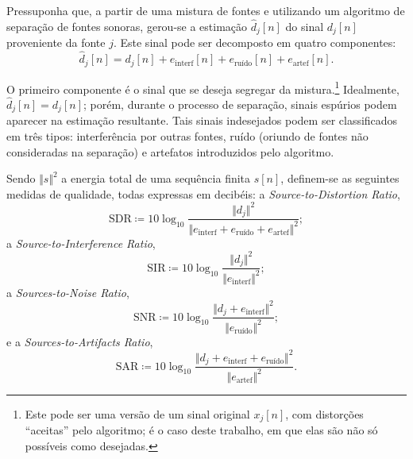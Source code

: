 Pressuponha que, a partir de uma mistura de fontes e utilizando um algoritmo de separação de fontes sonoras, gerou-se a estimação $\hat{d}_j[n]$ do sinal $d_j[n]$ proveniente da fonte $j$. Este sinal pode ser decomposto em quatro componentes:
\begin{equation}
    \hat{d}_j[n] = d_j[n] + e_{\text{interf}}[n] + e_{\text{ruído}}[n] + e_{\text{artef}}[n].
    \label{eq:metrics:d-hat}
\end{equation}

O primeiro componente é o sinal que se deseja segregar da mistura.\footnote{Este pode ser uma versão de um sinal original $x_j[n]$, com distorções ``aceitas'' pelo algoritmo; é o caso deste trabalho, em que elas são não só possíveis como desejadas.} Idealmente, $\hat{d}_j[n] = d_j[n]$; porém, durante o processo de separação, sinais espúrios podem aparecer na estimação resultante. Tais sinais indesejados podem ser classificados em três tipos: interferência por outras fontes, ruído (oriundo de fontes não consideradas na separação) e artefatos introduzidos pelo algoritmo.

Sendo $\Vert s \Vert^2$ a energia total de uma sequência finita $s[n]$, definem-se as seguintes medidas de qualidade, todas expressas em decibéis: a \textit{Source-to-Distortion Ratio},
\begin{equation}
    \text{SDR} \coloneqq 10 \log_{10} \frac{\Vert d_j \Vert^2}{\Vert e_{\text{interf}} + e_{\text{ruído}} + e_{\text{artef}} \Vert^2};
    \label{eq:metrics:sdr-original}
\end{equation}
a \textit{Source-to-Interference Ratio},
\begin{equation}
    \text{SIR} \coloneqq 10 \log_{10} \frac{\Vert d_j \Vert^2}{\Vert e_{\text{interf}} \Vert^2};
\end{equation}
a \textit{Sources-to-Noise Ratio},
\begin{equation}
    \text{SNR} \coloneqq 10 \log_{10} \frac{\Vert d_j + e_{\text{interf}} \Vert^2}{\Vert e_{\text{ruído}}\Vert^2};
\end{equation}
e a \textit{Sources-to-Artifacts Ratio},
\begin{equation}
    \text{SAR} \coloneqq 10 \log_{10} \frac{\Vert d_j + e_{\text{interf}} + e_{\text{ruído}}\Vert^2}{\Vert e_{\text{artef}} \Vert^2}.
\end{equation}

